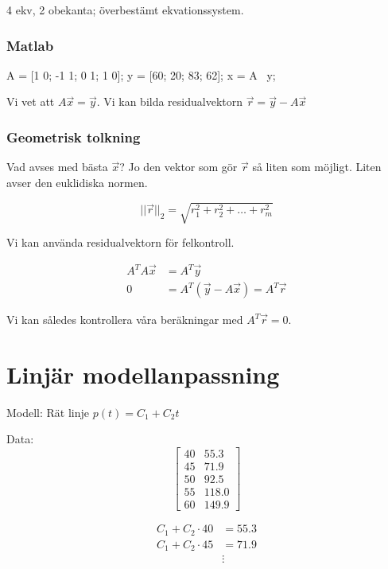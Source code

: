 \documentclass[a4paper,10pt,swedish]{memoir}
\numberwithin{equation}{subsection}
\begin{document}
4 ekv, 2 obekanta; överbestämt ekvationssystem.

\subsubsection{Matlab}

\begin{matlabcode}
A = [1 0; -1 1; 0 1; 1 0];
y = [60; 20; 83; 62];
x = A \ y;
\end{matlabcode}

Vi vet att $A\vec{x}=\vec{y}$. Vi kan bilda residualvektorn
$\vec{r}=\vec{y}-A\vec{x}$

\subsubsection{Geometrisk tolkning}

Vad avses med bästa $\vec{x}$? Jo den vektor som gör $\vec{r}$ så
liten som möjligt. Liten avser den euklidiska normen.

\begin{equation}
||\vec{r}||_2 = \sqrt{r_1^2 + r_2^2 + \ldots + r_m^2}
\end{equation}

Vi kan använda residualvektorn för felkontroll.

\begin{align}
A^TA \vec{x} &= A^T\vec{y} \\
0 &= A^T(\vec{y}-A\vec{x}) = A^T \vec{r}
\end{align}

Vi kan således kontrollera våra beräkningar med $A^T\vec{r} = 0$.

\section{Linjär modellanpassning}

Modell: Rät linje $p(t) = C_1 + C_2 t$

Data: \[\left[\begin{array}{cc}40&55.3\\45&71.9\\50&92.5\\55&118.0\\60&149.9\end{array}\right]\]

\begin{align}
C_1 + C_2 \cdot 40 &= 55.3 \\
C_1 + C_2 \cdot 45 &= 71.9 \\
&\vdots
\end{align}
\end{document}
